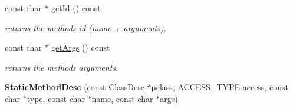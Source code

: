 \begin{DoxyCompactItemize}
const char $\ast$ \hyperlink{classagm_1_1reflection_1_1_static_method_desc_ad1b5f80c9ad11662594f237908eea415}{get\+Id} () const 
\begin{DoxyCompactList}\small\item\em returns the method\textquotesingle{}s id (name + arguments). \end{DoxyCompactList}\item 
const char $\ast$ \hyperlink{classagm_1_1reflection_1_1_static_method_desc_acd1ae20f10a9f57736e17c2478cc84ba}{get\+Args} () const 
\begin{DoxyCompactList}\small\item\em returns the method\textquotesingle{}s arguments. \end{DoxyCompactList}\item 
{\bfseries Static\+Method\+Desc} (const \hyperlink{classagm_1_1reflection_1_1_class_desc}{Class\+Desc} $\ast$pclass, A\+C\+C\+E\+S\+S\+\_\+\+T\+Y\+PE access, const char $\ast$type, const char $\ast$name, const char $\ast$args)\hypertarget{classagm_1_1reflection_1_1_static_method_desc_ab585dd3fb506269e54f33989e18a6eec}{}\label{classagm_1_1reflection_1_1_static_method_desc_ab585dd3fb506269e54f33989e18a6eec}

\end{DoxyCompactItemize}
